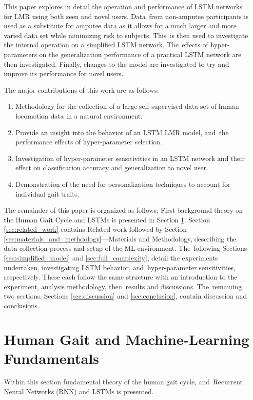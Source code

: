 This paper explores in detail the operation and performance of LSTM networks for LMR using both seen and novel users. Data~from non-amputee participants is used as a substitute for amputee data as it allows for a much larger and more varied data set while minimizing risk to subjects. This~is then used to investigate the internal operation on a simplified LSTM network. The~effects of hyper-parameters on the generalization performance of a practical LSTM network are then investigated. Finally, changes to the model are investigated to try and improve its performance for novel users. 

The major contributions of this work are as follows:
\begin{enumerate}
\item Methodology for the collection of a large self-supervised data set of human locomotion data in a natural environment.
\item Provide an insight into the behavior of an LSTM LMR model, and~the performance effects of hyper-parameter selection.
\item Investigation of hyper-parameter sensitivities in an LSTM network and their effect on classification accuracy and generalization to novel user.
\item Demonstration of the need for personalization techniques to account for individual gait traits.
\end{enumerate}

The remainder of this paper is organized as follows; First background theory on the Human Gait Cycle and LSTMs is presented in Section \ref{sec:theory}. Section \ref{sec:related_work} contains Related work followed by Section \ref{sec:materials_and_methdology}---Materials and Methodology, describing the data collection process and setup of the ML environment. The~following Sections  \ref{sec:simplified_model} and \ref{sec:full_complexity}, detail the experiments undertaken, investigating LSTM behavior, and~hyper-parameter sensitivities, respectively. These each follow the same structure with an introduction to the experiment, analysis methodology, then~results and discussions. The~remaining two sections, Sections \ref{sec:discussion} and \ref{sec:conclusion}, contain discussion and conclusions.

\section{Human Gait and Machine-Learning Fundamentals}
\label{sec:theory}
Within this section fundamental theory of the human gait cycle, and~Recurrent Neural Networks (RNN) and LSTMs is presented.

